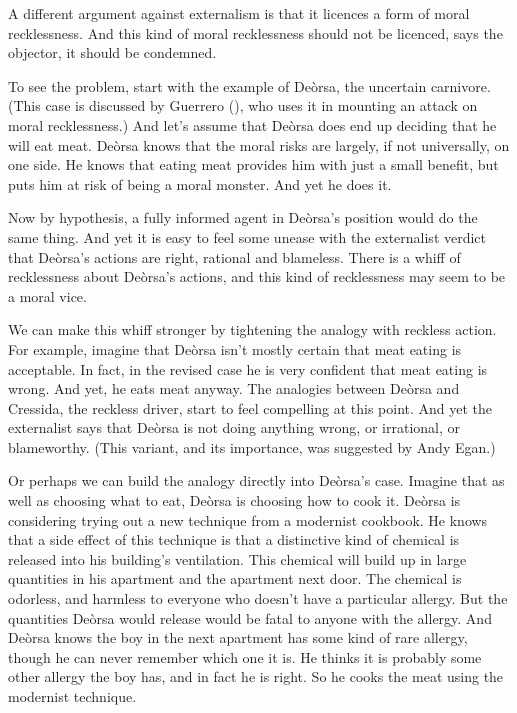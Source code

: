\documentclass[
  10pt,
  letterpaper,
  twoside]{scrbook}
\begin{document}
A different argument against externalism is that it licences a form of
moral recklessness. And this kind of moral recklessness should not be
licenced, says the objector, it should be condemned.

To see the problem, start with the example of Deòrsa, the uncertain
carnivore. (This case is discussed by Guerrero
(), who uses it in mounting an attack
on moral recklessness.) And let's assume that Deòrsa does end up
deciding that he will eat meat. Deòrsa knows that the moral risks are
largely, if not universally, on one side. He knows that eating meat
provides him with just a small benefit, but puts him at risk of being a
moral monster. And yet he does it.

Now by hypothesis, a fully informed agent in Deòrsa's position would do
the same thing. And yet it is easy to feel some unease with the
externalist verdict that Deòrsa's actions are right, rational and
blameless. There is a whiff of recklessness about Deòrsa's actions, and
this kind of recklessness may seem to be a moral vice.

We can make this whiff stronger by tightening the analogy with reckless
action. For example, imagine that Deòrsa isn't mostly certain that meat
eating is acceptable. In fact, in the revised case he is very confident
that meat eating is wrong. And yet, he eats meat anyway. The analogies
between Deòrsa and {Cressida}, the reckless driver, start to feel
compelling at this point. And yet the externalist says that Deòrsa is
not doing anything wrong, or irrational, or blameworthy. (This variant,
and its importance, was suggested by Andy Egan.)

Or perhaps we can build the analogy directly into Deòrsa's case. Imagine
that as well as choosing what to eat, Deòrsa is choosing how to cook it.
Deòrsa is considering trying out a new technique from a modernist
cookbook. He knows that a side effect of this technique is that a
distinctive kind of chemical is released into his building's
ventilation. This chemical will build up in large quantities in his
apartment and the apartment next door. The chemical is odorless, and
harmless to everyone who doesn't have a particular allergy. But the
quantities Deòrsa would release would be fatal to anyone with the
allergy. And Deòrsa knows the boy in the next apartment has some kind of
rare allergy, though he can never remember which one it is. He thinks it
is probably some other allergy the boy has, and in fact he is right. So
he cooks the meat using the modernist technique.
\end{document}
